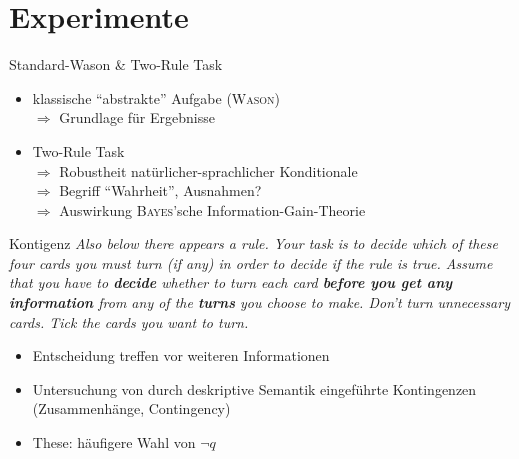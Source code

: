 
\section{Experimente}

\begin{frame}{Standard-Wason \& Two-Rule Task {\scriptsize \cite[S.~95-96]{stenningHumanReasoningCognitive2008}}}
    \begin{itemize}
        \item klassische \enquote{abstrakte} Aufgabe (\textsc{Wason}) \\
            $\Rightarrow$ Grundlage für Ergebnisse
        \pause

        \item Two-Rule Task \\
            $\Rightarrow$ Robustheit natürlicher-sprachlicher Konditionale \\
            $\Rightarrow$ Begriff \enquote{Wahrheit}, Ausnahmen? \\
            \pause
            $\Rightarrow$ Auswirkung \textsc{Bayes}'sche Information-Gain-Theorie
    \end{itemize}
\end{frame}


\begin{frame}{Kontigenz {\scriptsize \cite[S.~96-97]{stenningHumanReasoningCognitive2008}}}
    \emph{
        {\small Also below there appears a rule.
        Your task is to decide which of these four cards you must turn (if any) in order to decide if the rule is true.}
        \alert{Assume that you have to \textbf{decide} whether to turn each card \textbf{before you get any information} from any of the \textbf{turns} you choose to make.}
        {\small Don't turn unnecessary cards. Tick the cards you want to turn.}
    }

    \begin{itemize}
        \item Entscheidung treffen vor weiteren Informationen
        \pause
        \item Untersuchung von durch deskriptive Semantik eingeführte Kontingenzen {\footnotesize (Zusammenhänge, Contingency)}
        \item These: häufigere Wahl von $\lnot q$
    \end{itemize}
\end{frame}


